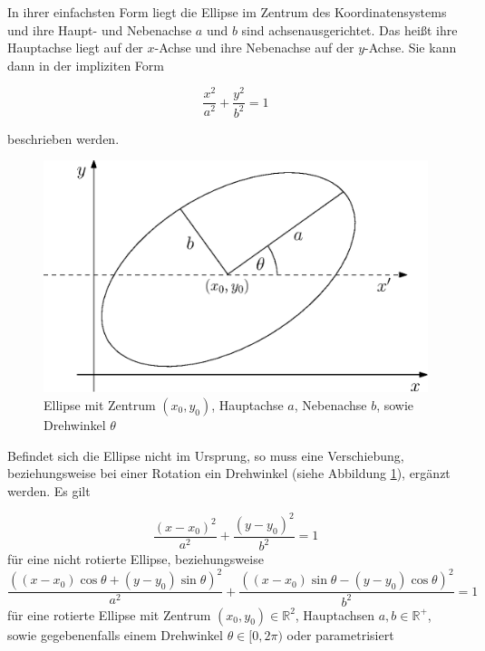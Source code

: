 In ihrer einfachsten Form liegt die Ellipse im Zentrum des Koordinatensystems und ihre Haupt- und Nebenachse $a$ und $b$ sind achsenausgerichtet. Das heißt ihre Hauptachse liegt auf der $x$-Achse und ihre Nebenachse auf der $y$-Achse. Sie kann dann in der impliziten Form

\begin{equation} \label{eq:ellipseNoRotNoTrans}
\frac{x^2}{a^2} + \frac{y^2}{b^2} = 1
\end{equation}

beschrieben werden.

\begin{figure}[!htb]
	\centering
	\includegraphics[scale=.7]{images/ellipse.eps}
	\caption{Ellipse mit Zentrum $(x_0, y_0)$, Hauptachse $a$, Nebenachse $b$, sowie Drehwinkel $\theta$}
	\label{fig:ellipse}
\end{figure}

Befindet sich die Ellipse nicht im Ursprung, so muss eine Verschiebung, beziehungsweise bei einer Rotation ein Drehwinkel (siehe Abbildung \ref{fig:ellipse}), ergänzt werden. Es gilt

\begin{equation} \label{eq:ellipseNoRotTrans}
\frac{\left(x-x_0\right)^2}{a^2} + \frac{\left(y-y_0\right)^2}{b^2} = 1
\end{equation}
für eine nicht rotierte Ellipse, beziehungsweise
\begin{equation} \label{eq:ellipseRotTrans}
\frac{((x - x_0)\cos\theta + (y - y_0)\sin\theta)^2}{a^2} + \frac{((x - x_0)\sin\theta - (y - y_0)\cos\theta)^2}{b^2} = 1
\end{equation}
für eine rotierte Ellipse mit Zentrum $(x_0,y_0)\in\mathbb{R}^2$, Hauptachsen $a,b\in\mathbb{R}^+$, sowie gegebenenfalls einem Drehwinkel $\theta \in [0,2\pi)$ oder parametrisiert

